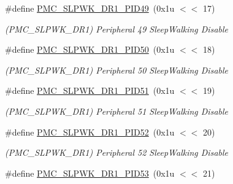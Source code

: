 \begin{DoxyCompactItemize}
\mbox{\label{group__SAMV71__PMC_gaf486f7e217b7465f8dbdac9d83d50ffd}} 
\#define \mbox{\hyperlink{group__SAMV71__PMC_gaf486f7e217b7465f8dbdac9d83d50ffd}{P\+M\+C\+\_\+\+S\+L\+P\+W\+K\+\_\+\+D\+R1\+\_\+\+P\+I\+D49}}~(0x1u $<$$<$ 17)
\begin{DoxyCompactList}\small\item\em (P\+M\+C\+\_\+\+S\+L\+P\+W\+K\+\_\+\+D\+R1) Peripheral 49 Sleep\+Walking Disable \end{DoxyCompactList}\item 
\mbox{\label{group__SAMV71__PMC_ga9ac2b90f28a4c61bb37a6fa7dff3ac06}} 
\#define \mbox{\hyperlink{group__SAMV71__PMC_ga9ac2b90f28a4c61bb37a6fa7dff3ac06}{P\+M\+C\+\_\+\+S\+L\+P\+W\+K\+\_\+\+D\+R1\+\_\+\+P\+I\+D50}}~(0x1u $<$$<$ 18)
\begin{DoxyCompactList}\small\item\em (P\+M\+C\+\_\+\+S\+L\+P\+W\+K\+\_\+\+D\+R1) Peripheral 50 Sleep\+Walking Disable \end{DoxyCompactList}\item 
\mbox{\label{group__SAMV71__PMC_gaa0ca00032c84b2ac985009d303b9a492}} 
\#define \mbox{\hyperlink{group__SAMV71__PMC_gaa0ca00032c84b2ac985009d303b9a492}{P\+M\+C\+\_\+\+S\+L\+P\+W\+K\+\_\+\+D\+R1\+\_\+\+P\+I\+D51}}~(0x1u $<$$<$ 19)
\begin{DoxyCompactList}\small\item\em (P\+M\+C\+\_\+\+S\+L\+P\+W\+K\+\_\+\+D\+R1) Peripheral 51 Sleep\+Walking Disable \end{DoxyCompactList}\item 
\mbox{\label{group__SAMV71__PMC_gab88c17991c3799f2ac218ae9bb32fe4f}} 
\#define \mbox{\hyperlink{group__SAMV71__PMC_gab88c17991c3799f2ac218ae9bb32fe4f}{P\+M\+C\+\_\+\+S\+L\+P\+W\+K\+\_\+\+D\+R1\+\_\+\+P\+I\+D52}}~(0x1u $<$$<$ 20)
\begin{DoxyCompactList}\small\item\em (P\+M\+C\+\_\+\+S\+L\+P\+W\+K\+\_\+\+D\+R1) Peripheral 52 Sleep\+Walking Disable \end{DoxyCompactList}\item 
\mbox{\label{group__SAMV71__PMC_ga05d44f982b76fd967b0d503d96cff30d}} 
\#define \mbox{\hyperlink{group__SAMV71__PMC_ga05d44f982b76fd967b0d503d96cff30d}{P\+M\+C\+\_\+\+S\+L\+P\+W\+K\+\_\+\+D\+R1\+\_\+\+P\+I\+D53}}~(0x1u $<$$<$ 21)
$$
\end{DoxyCompactItemize}
